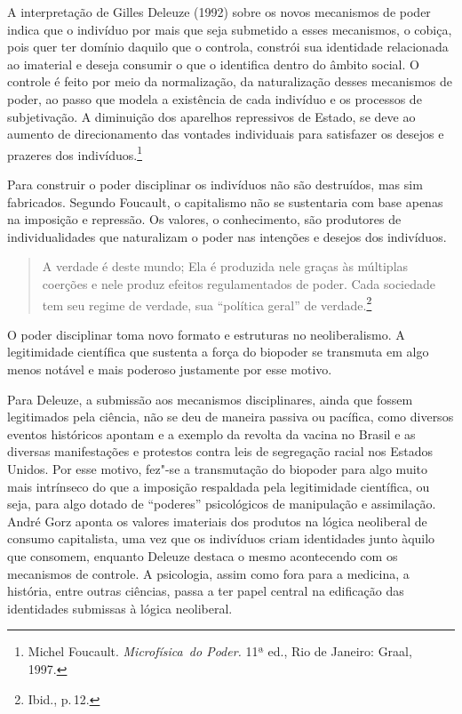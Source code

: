 A interpretação de Gilles Deleuze (1992) sobre os novos mecanismos de
poder indica que o indivíduo por mais que seja submetido a esses
mecanismos, o cobiça, pois quer ter domínio daquilo que o controla,
constrói sua identidade relacionada ao imaterial e deseja consumir o que
o identifica dentro do âmbito social. O controle é feito por meio da
normalização, da naturalização desses mecanismos de poder, ao passo que
modela a existência de cada indivíduo e os processos de subjetivação. A
diminuição dos aparelhos repressivos de Estado, se deve ao aumento de
direcionamento das vontades individuais para satisfazer os desejos e
prazeres dos indivíduos.\footnote{Michel Foucault. \emph{Microfísica~do Poder.} 11ª ed., Rio de Janeiro: Graal, 1997.}

Para construir o poder disciplinar os indivíduos não são destruídos,
mas sim fabricados. Segundo Foucault, o capitalismo não se sustentaria
com base apenas na imposição e repressão. Os valores, o conhecimento,
são produtores de individualidades que naturalizam o poder nas intenções
e desejos dos indivíduos.

\begin{quote}
A verdade é deste mundo; Ela é produzida nele graças às múltiplas
coerções e nele produz efeitos regulamentados de poder. Cada sociedade
tem seu regime de verdade, sua ``política geral'' de verdade.\footnote{Ibid., p.\,12.}
\end{quote}

O poder disciplinar toma novo formato e estruturas no neoliberalismo. A
legitimidade científica que sustenta a força do biopoder se transmuta em
algo menos notável e mais poderoso justamente por esse motivo.

Para Deleuze, a submissão aos mecanismos disciplinares, ainda que fossem
legitimados pela ciência, não se deu de maneira passiva ou pacífica,
como diversos eventos históricos apontam e a exemplo da revolta da
vacina no Brasil e as diversas manifestações e protestos contra leis de
segregação racial nos Estados Unidos. Por esse motivo, fez"-se a
transmutação do biopoder para algo muito mais intrínseco do que a
imposição respaldada pela legitimidade científica, ou seja, para algo
dotado de ``poderes'' psicológicos de manipulação e assimilação. André
Gorz aponta os valores imateriais dos produtos na lógica neoliberal de
consumo capitalista, uma vez que os indivíduos criam identidades junto
àquilo que consomem, enquanto Deleuze destaca o mesmo acontecendo com os
mecanismos de controle. A psicologia, assim como fora para a medicina, a
história, entre outras ciências, passa a ter papel central na edificação
das identidades submissas à lógica neoliberal.

